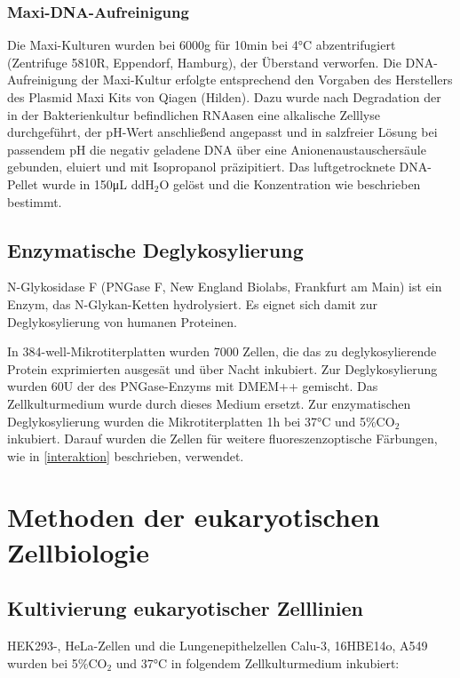 \subsubsection{Maxi-DNA-Aufreinigung}
Die Maxi-Kulturen wurden bei 6000g für 10\si{\minute} bei 4\si{\celsius} abzentrifugiert (Zentrifuge 5810R, Eppendorf, Hamburg), der Überstand verworfen.
Die DNA-Aufreinigung der Maxi-Kultur erfolgte entsprechend den Vorgaben des Herstellers des  Plasmid Maxi Kits von Qiagen (Hilden). Dazu wurde nach Degradation der in der Bakterienkultur befindlichen RNAasen eine alkalische Zelllyse durchgeführt, der pH-Wert anschließend angepasst und in salzfreier Lösung bei passendem pH die negativ geladene DNA über eine Anionenaustauschersäule gebunden, eluiert und mit Isopropanol präzipitiert. Das luftgetrocknete DNA-Pellet wurde in 150\si{\micro\liter} ddH$_2$O gelöst und die Konzentration wie beschrieben bestimmt. 

\subsection{Enzymatische Deglykosylierung}
N-Glykosidase F (PNGase F, New England Biolabs, Frankfurt am Main) ist ein Enzym, das N-Glykan-Ketten hydrolysiert. Es eignet sich damit zur Deglykosylierung von humanen Proteinen.

 In 384-well-Mikrotiterplatten wurden 7000 Zellen, die das zu deglykosylierende Protein exprimierten ausgesät und über Nacht inkubiert. Zur Deglykosylierung wurden 60U der des PNGase-Enzyms mit DMEM++ gemischt. Das Zellkulturmedium wurde durch dieses Medium ersetzt. Zur enzymatischen Deglykosylierung wurden die Mikrotiterplatten 1\si{\hour} bei 37\si{\celsius} und 5\%CO$_2$ inkubiert. Darauf wurden die Zellen für weitere fluoreszenzoptische Färbungen, wie in \ref{interaktion} beschrieben, verwendet.

\section{Methoden der eukaryotischen Zellbiologie}
\subsection{Kultivierung eukaryotischer Zelllinien} \label{Kultur}
HEK293-, HeLa-Zellen und die Lungenepithelzellen Calu-3, 16HBE14o, A549 wurden bei 5\%CO$_2$ und 37\si{\celsius} in folgendem Zellkulturmedium inkubiert:

